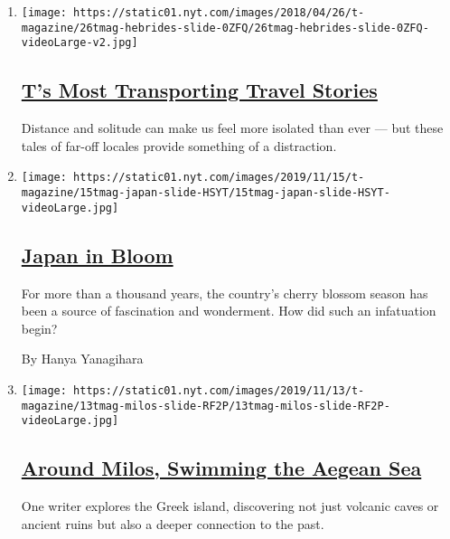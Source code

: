 \begin{enumerate}
\def\labelenumi{\arabic{enumi}.}
\item
  \texttt{[image: https://static01.nyt.com/images/2018/04/26/t-magazine/26tmag-hebrides-slide-0ZFQ/26tmag-hebrides-slide-0ZFQ-videoLarge-v2.jpg]}

  \hypertarget{ts-most-transporting-travel-stories}{%
  \subsection{\texorpdfstring{\href{/2020/03/27/t-magazine/virtual-travel.html}{T's
  Most Transporting Travel
  Stories}}{T's Most Transporting Travel Stories}}\label{ts-most-transporting-travel-stories}}

  Distance and solitude can make us feel more isolated than ever --- but
  these tales of far-off locales provide something of a distraction.
\item
  \texttt{[image: https://static01.nyt.com/images/2019/11/15/t-magazine/15tmag-japan-slide-HSYT/15tmag-japan-slide-HSYT-videoLarge.jpg]}

  \hypertarget{japan-in-bloom}{%
  \subsection{\texorpdfstring{\href{/2019/11/15/t-magazine/japan-cherry-blossoms.html}{Japan
  in Bloom}}{Japan in Bloom}}\label{japan-in-bloom}}

  For more than a thousand years, the country's cherry blossom season
  has been a source of fascination and wonderment. How did such an
  infatuation begin?

  By Hanya Yanagihara
\item
  \texttt{[image: https://static01.nyt.com/images/2019/11/13/t-magazine/13tmag-milos-slide-RF2P/13tmag-milos-slide-RF2P-videoLarge.jpg]}

  \hypertarget{around-milos-swimming-the-aegean-sea}{%
  \subsection{\texorpdfstring{\href{/2019/11/14/t-magazine/milos-greece-swimming.html}{Around
  Milos, Swimming the Aegean
  Sea}}{Around Milos, Swimming the Aegean Sea}}\label{around-milos-swimming-the-aegean-sea}}

  One writer explores the Greek island, discovering not just volcanic
  caves or ancient ruins but also a deeper connection to the past.


\end{enumerate}
